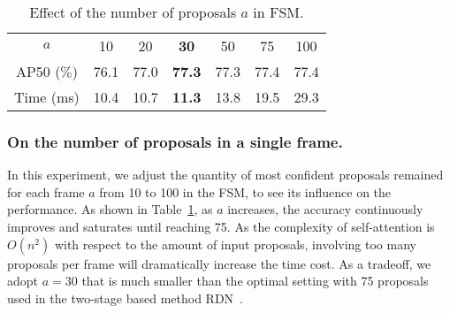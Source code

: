 \documentclass[letterpaper]{article} \usepackage{aaai23}  \usepackage{times}  \usepackage{helvet}  \usepackage{courier}  \usepackage[hyphens]{url}  \usepackage{graphicx} \urlstyle{rm} \def\UrlFont{\rm}  \usepackage{natbib}  \usepackage{caption} \usepackage{xcolor}
\begin{document}
\setlength{\tabcolsep}{4pt}
\begin{table}
\begin{center}
\begin{tabular}{c|cccccc}
\hline\noalign{\smallskip}
$a$ & 10 & 20 & \textbf{30} & 50 & 75 & 100\\
\noalign{\smallskip}
\hline
\noalign{\smallskip}
AP50 ($\%$) & 76.1 & 77.0 & \textbf{77.3} & 77.3 & 77.4 & 77.4 \\
\hline
\noalign{\smallskip}
Time (ms) & 10.4 & 10.7 & \textbf{11.3} & 13.8 & 19.5 & 29.3 \\
\hline
\end{tabular}
\end{center}
\caption{Effect of the number of proposals $a$ in FSM.}
\label{table:effectiveness of a in fsm}
\end{table}



\subsubsection{On the number of proposals in a single frame.}
In this experiment, we adjust the quantity of most confident proposals remained for each frame $a$ from 10 to 100 in the FSM, to see its influence on the performance. As shown in Table~\ref{table:effectiveness of a in fsm}, as $a$ increases, the accuracy continuously improves and saturates until reaching 75. As the complexity of self-attention is $O\left(n^{2}\right)$ with respect to the amount of input proposals, involving too many proposals per frame will dramatically increase the time cost. As a tradeoff, we adopt $a=30$ that is much smaller than the optimal setting with 75 proposals used in the two-stage based method RDN~\cite{deng2019relation}. 
\end{document}

